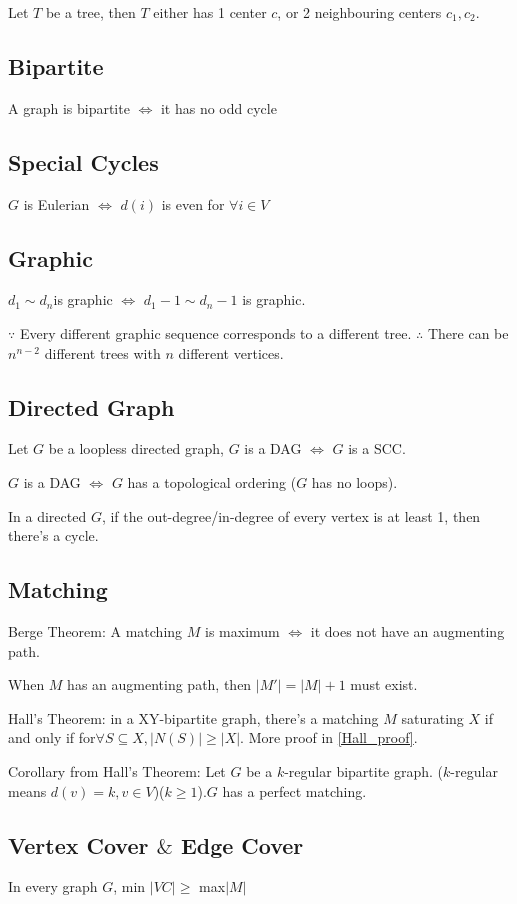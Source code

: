 \documentclass[12pt,a4paper]{ctexrep}
\begin{document}
Let $T$ be a tree, then $T$ either has 1 center $c$, or 2 neighbouring centers $c_{1},c_{2}$.
\subsection{Bipartite}
A graph is bipartite $\iff$ it has no odd cycle
\subsection{Special Cycles}
$G$ is Eulerian $\iff$ $d(i)$ is even for $\forall i \in V$
\subsection{Graphic}
$d_{1} \sim d_{n}$is graphic $\iff$ $d_{1}-1 \sim d_{n}-1$ is graphic.

$\because$ Every different graphic sequence corresponds to a different tree. $\therefore$ There can be $n^{n-2}$ different trees with $n$ different vertices.
\subsection{Directed Graph}
Let $G$ be a loopless directed graph, $G$ is a DAG $\iff$ $G$ is a SCC.

$G$ is a DAG $\iff$ $G$ has a topological ordering ($G$ has no loops).

In a directed $G$, if the out-degree/in-degree of every vertex is at least 1, then there's a cycle.
\subsection{Matching}
Berge Theorem: A matching $M$ is maximum $\iff$ it does not have an augmenting path.

When $M$ has an augmenting path, then $|M'| = |M|+1$ must exist.

Hall's Theorem: in a XY-bipartite graph, there's a matching $M$ saturating $X$ if and only if for$\forall S \subseteq X, |N(S)|\geq |X|$. More proof in \hyperlink{Hall_proof}{\ref{Hall_proof}}. \label{Hall_theorem}\hypertarget{Hall_theorem}{}

Corollary from Hall's Theorem: Let $G$ be a $k$-regular bipartite graph. ($k$-regular means $d(v) = k,v\in V$)($k\geq 1$).$G$ has a perfect matching.
\subsection{Vertex Cover $\&$ Edge Cover}
In every graph $G$, min $|VC| \geq$ max$|M|$
\end{document}
